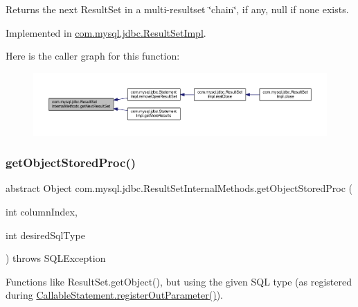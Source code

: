 Returns the next Result\+Set in a multi-\/resultset \char`\"{}chain\char`\"{}, if any, null if none exists. 

Implemented in \mbox{\hyperlink{classcom_1_1mysql_1_1jdbc_1_1_result_set_impl_a95c75be5755be8089539b6e62059ff5d}{com.\+mysql.\+jdbc.\+Result\+Set\+Impl}}.

Here is the caller graph for this function\+:
\nopagebreak
\begin{figure}[H]
\begin{center}
\leavevmode
\includegraphics[width=350pt]{interfacecom_1_1mysql_1_1jdbc_1_1_result_set_internal_methods_a6e4a07c50830687cccf98fb12bdd3e37_icgraph}
\end{center}
\end{figure}
\mbox{\label{interfacecom_1_1mysql_1_1jdbc_1_1_result_set_internal_methods_a817a3b9788bab58dde079d89c4c0d1d9}} 
\subsubsection{\texorpdfstring{get\+Object\+Stored\+Proc()}{getObjectStoredProc()}\hspace{0.1cm}{\footnotesize\ttfamily [1/4]}}
{\footnotesize\ttfamily abstract Object com.\+mysql.\+jdbc.\+Result\+Set\+Internal\+Methods.\+get\+Object\+Stored\+Proc (\begin{DoxyParamCaption}\item[{int}]{column\+Index,  }\item[{int}]{desired\+Sql\+Type }\end{DoxyParamCaption}) throws S\+Q\+L\+Exception\hspace{0.3cm}{\ttfamily [abstract]}}

Functions like Result\+Set.\+get\+Object(), but using the given S\+QL type (as registered during \mbox{\hyperlink{classcom_1_1mysql_1_1jdbc_1_1_callable_statement_a5158af0506cf90040062b2049550f59b}{Callable\+Statement.\+register\+Out\+Parameter()}}). 

